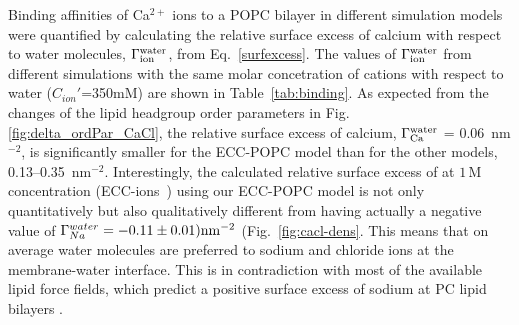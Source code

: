 \documentclass[journal=jpcbfk,manuscript=article]{achemso}
\begin{document}
Binding affinities of Ca$^{2+}$ ions to a POPC bilayer in different simulation models were quantified by calculating the relative surface excess of calcium with respect to water molecules, $\Gamma_{\rm ion}^{\rm water}$, from Eq.~\ref{surfexcess}.
The values of $\Gamma_{\rm ion}^{\rm water}$
from different simulations with the same molar concetration of cations with respect
to water ($C_{ion}'$=350mM) are shown in Table~\ref{tab:binding}.
As expected from the changes of the lipid headgroup order parameters in Fig.~ \ref{fig:delta_ordPar_CaCl}, the relative surface excess of calcium, $\Gamma_{\rm Ca}^{\rm water}$ = 0.06~nm$^{-2}$, is significantly smaller for the ECC-POPC model than for the other models, 0.13--0.35~nm$^{-2}$.
Interestingly, the calculated relative surface excess of  at $1\,\mathrm{M}$ concentration (ECC-ions~\cite{Pluharova2014}) using our ECC-POPC model is not only quantitatively but also qualitatively different from  having actually a negative value of $\Gamma_{Na}^{water} = -0.11 \pm 0.01) \rm{nm}^{-2}$ (Fig.~\ref{fig:cacl-dens}. This 
means that on average water molecules are preferred to sodium and chloride ions at the membrane-water interface.  
This is in contradiction with most of the available lipid force fields, which predict a positive surface excess of sodium at PC lipid bilayers \cite{catte16}.
\end{document}
